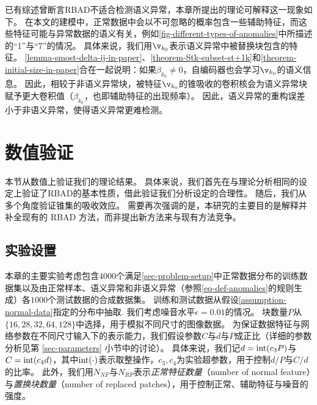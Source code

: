 \begin{remark}[语义异常难以检测]
\label{remark-semantic-anomalies-are-hard-to-detect}
已有综述\cite{DBLP:journals/pieee/RuffKVMSKDM21}曾断言RBAD不适合检测语义异常，本章所提出的理论可解释这一现象如下。
在本文的建模中，正常数据中会以不可忽略的概率包含一些辅助特征，而这些特征可能与异常数据的语义有关，例如\cref{fig-different-types-of-anomalies}中所描述的``1''与``7''的情况。
具体来说，我们用$\v_{k_0}$表示语义异常中被替换块包含的特征。
\cref{lemma-smost-delta-ij-in-paper}、\cref{theorem-Stk-subset-st+1k}和\cref{theorem-initial-size-in-paper}合在一起说明：如果$\beta_{k_0} \neq 0$，自编码器也会学习$\v_{k_0}$的语义信息。
因此，相较于非语义异常块，被特征$\v_{k_0}$的锥吸收的卷积核会为语义异常块赋予更大卷积值（$\beta_{k_0}$，也即辅助特征的出现频率）。
因此，语义异常的重构误差小于非语义异常，使得语义异常更难检测。 
\end{remark}

\section{数值验证}\label{sec-numerical-validation}

本节从数值上验证我们的理论结果。
具体来说，我们首先在与理论分析相同的设定上验证了RBAD的基本性质，借此验证我们分析设定的合理性。
随后，我们从多个角度验证锥集的吸收效应。
需要再次强调的是，本研究的主要目的是解释并补全现有的 RBAD 方法，而非提出新方法来与现有方法竞争。

\subsection{实验设置}
\label{rbad: exp setting}

本章的主要实验考虑包含$4000$个满足\cref{sec-problem-setup}中正常数据分布的训练数据集以及由正常样本、语义异常和非语义异常（参照\cref{eq-def-anomalies}的规则生成）各$1000$个测试数据的合成数据集。
训练和测试数据从假设\cref{assumption-normal-data}指定的分布中抽取.
我们考虑噪音水平$\epsilon = 0.01$的情况。
块数量$P$从$\{16, 28, 32, 64, 128\}$中选择，用于模拟不同尺寸的图像数据。
为保证数据特征与网络参数在不同尺寸输入下的表示能力，我们假设参数$C$与$d$与$P$成正比（详细的参数分析见第 \ref{sec-parameters} 小节中的讨论）。
具体来说，我们记$d = {\rm{int}}(c_3 P)$与$C = {\rm{int}}(c_4 d)$，其中${\rm{int}}(\cdot)$表示取整操作，$c_3,c_4$为实验超参数，用于控制$d/P$与$C/d$的比率。
此外，我们用$N_{NF}$与$N_{RP}$表示\emph{正常特征数量}（number of normal feature）与\emph{置换块数量}（number of replaced patches），用于控制正常、辅助特征与噪音的强度。

